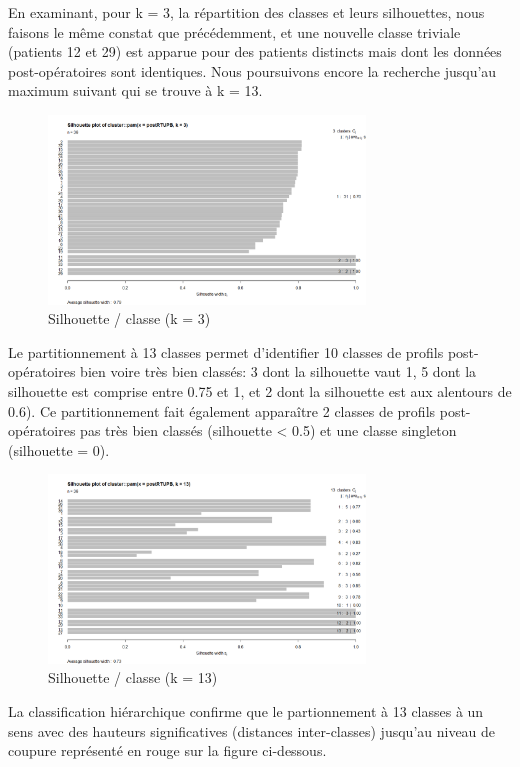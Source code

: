 En examinant, pour k = 3, la répartition des classes et leurs silhouettes, nous faisons le même constat que précédemment, et une nouvelle classe triviale (patients 12 et 29) est apparue pour des patients distincts
mais dont les données post-opératoires sont identiques. Nous poursuivons encore la recherche jusqu'au maximum suivant qui se trouve à k = 13.

\begin{figure}[H]
\centering
\includegraphics[width=0.75\textwidth]{../Fig/RTUPB/rtupb-sil-k3-post.png}
\caption{Silhouette / classe (k = 3)}
\end{figure}

Le partitionnement à 13 classes permet d'identifier 10 classes de profils post-opératoires bien voire très bien classés: 3 dont la silhouette vaut 1, 5 dont la silhouette est comprise entre 0.75 et 1, et 2 dont la silhouette
est aux alentours de 0.6). Ce partitionnement fait également apparaître 2 classes de profils post-opératoires pas très bien classés (silhouette < 0.5) et une classe singleton (silhouette = 0). 

\begin{figure}[H]
\centering
\includegraphics[width=0.75\textwidth]{../Fig/RTUPB/rtupb-sil-k13-post.png}
\caption{Silhouette / classe (k = 13)}
\end{figure}

La classification hiérarchique confirme que le partionnement à 13 classes à un sens avec des hauteurs
significatives (distances inter-classes) jusqu'au niveau de coupure représenté en rouge sur la figure ci-dessous.

